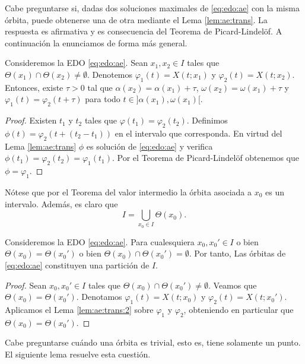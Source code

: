 \documentclass{article}
\begin{document}
Cabe preguntarse si, dadas dos soluciones maximales de \eqref{eq:edo:ae} con la misma órbita, puede
obtenerse una de otra mediante el Lema \ref{lem:ae:trans}. La respuesta es afirmativa y es
consecuencia del Teorema de Picard-Lindelöf. A continuación la enunciamos de forma más general.

\begin{lemma} \label{lem:ae:trans:2} Consideremos la EDO \eqref{eq:edo:ae}. Sean $x_1, x_2 \in I$
  tales que $\Theta(x_1) \cap \Theta(x_2) \ne \emptyset$. Denotemos $\varphi_1(t) = X(t;x_1)$ y
  $\varphi_2(t) = X(t;x_2)$. Entonces, existe $\tau > 0$ tal que $\alpha(x_2) = \alpha(x_1)+\tau$,
  $\omega(x_2) = \omega(x_1)+\tau$ y $\varphi_1(t) = \varphi_2(t+\tau)$ para todo
  $t \in ]\alpha(x_1), \omega(x_1)[$.
\end{lemma}
\begin{proof}
  Existen $t_1$ y $t_2$ tales que $\varphi(t_1) = \varphi_2(t_2)$. Definimos
  $\phi(t) = \varphi_2(t + (t_2 - t_1))$ en el intervalo que corresponda. En virtud del Lema
  \ref{lem:ae:trans} $\phi$ es solución de \eqref{eq:edo:ae} y verifica
  $\phi(t_1) = \varphi_2(t_2) = \varphi_1(t_1)$. Por el Teorema de Picard-Lindelöf obtenemos que
  $\phi = \varphi_1$.
\end{proof}

Nótese que por el Teorema del valor intermedio la órbita asociada a $x_0$ es un intervalo. Además,
es claro que
\[I = \bigcup_{x_0 \in I} \Theta(x_0).\]

\begin{cor} \label{cor:ae:particion} Consideremos la EDO \eqref{eq:edo:ae}. Para cualesquiera
  $x_0, x_0' \in I$ o bien $\Theta(x_0) = \Theta(x_0')$ o bien
  $\Theta(x_0) \cap \Theta(x_0') = \emptyset$. Por tanto, Las órbitas de \eqref{eq:edo:ae}
  constituyen una partición de $I$.
\end{cor}
\begin{proof}
  Sean $x_0, x_0' \in I$ tales que $\Theta(x_0) \cap \Theta(x_0') \ne \emptyset$.  Veamos que
  $\Theta(x_0) = \Theta(x_0')$. Denotamos $\varphi_1(t) = X(t; x_0)$ y $\varphi_2(t) = X(t;
  x_0')$. Aplicamos el Lema \ref{lem:ae:trans:2} sobre $\varphi_1$ y $\varphi_2$, obteniendo en
  particular que $\Theta(x_0) = \Theta(x_0')$.
\end{proof}

Cabe preguntarse cuándo una órbita es trivial, esto es, tiene solamente un punto. El siguiente lema
resuelve esta cuestión.
\end{document}
